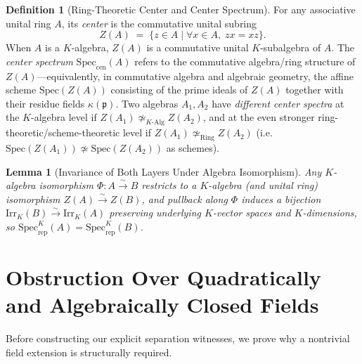 \documentclass[11pt,a4paper]{article}
\theoremstyle{plain}
\newtheorem{lemma}[theorem]{Lemma}
\theoremstyle{definition}
\newtheorem{definition}[theorem]{Definition}
\newcommand{\Irr}{\mathrm{Irr}}
\newcommand{\Specrep}{\mathrm{Spec}_{\mathrm{rep}}}
\newcommand{\Speccen}{\mathrm{Spec}_{\mathrm{cen}}}
\newcommand{\Spec}{\mathrm{Spec}}
\begin{document}
\begin{definition}[Ring-Theoretic Center and Center Spectrum]\label{def:cen-spec}
For any associative unital ring $A$, its \emph{center} is the commutative unital subring
\begin{equation}\label{eq:center}
  Z(A) \;=\; \{z \in A \mid \forall x \in A,\; z x = x z\}.
\end{equation}
When $A$ is a $K$-algebra, $Z(A)$ is a commutative unital $K$-subalgebra of $A$. The \emph{center spectrum} $\Speccen(A)$ refers to the commutative algebra/ring structure of $Z(A)$---equivalently, in commutative algebra and algebraic geometry, the affine scheme $\Spec(Z(A))$ consisting of the prime ideals of $Z(A)$ together with their residue fields $\kappa(\mathfrak{p})$. Two algebras $A_1, A_2$ have \emph{different center spectra} at the $K$-algebra level if $Z(A_1) \not\simeq_{K\text{-}\mathrm{Alg}} Z(A_2)$, and at the even stronger ring-theoretic/scheme-theoretic level if $Z(A_1) \not\simeq_{\mathrm{Ring}} Z(A_2)$ (i.e.\ $\Spec(Z(A_1)) \not\simeq \Spec(Z(A_2))$ as schemes).
\end{definition}

\begin{lemma}[Invariance of Both Layers Under Algebra Isomorphism]\label{lem:invariance}
Any $K$-algebra isomorphism $\Phi : A \xrightarrow{\sim} B$ restricts to a $K$-algebra (and unital ring) isomorphism $Z(A) \xrightarrow{\sim} Z(B)$, and pullback along $\Phi$ induces a bijection $\Irr_K(B) \xrightarrow{\sim} \Irr_K(A)$ preserving underlying $K$-vector spaces and $K$-dimensions, so $\Specrep^K(A) = \Specrep^K(B)$.
\end{lemma}

\section{Obstruction Over Quadratically and Algebraically Closed Fields}

Before constructing our explicit separation witnesses, we prove why a nontrivial field extension is structurally required.
\end{document}
